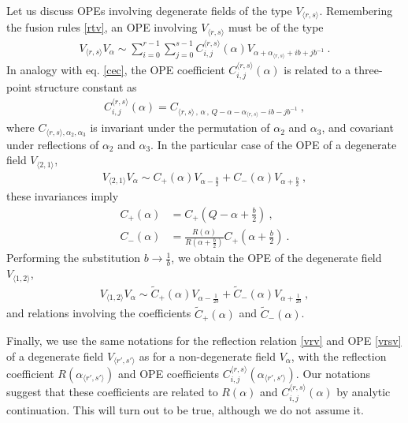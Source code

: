 \documentclass[12pt, a4paper, notitlepage, twoside]{report}
\numberwithin{equation}{section}
\theoremstyle{break}
\begin{document}
Let us discuss OPEs involving degenerate fields of the type $V_{\langle r,s \rangle}$.
Remembering the fusion rules \eqref{rtv}, an OPE involving $V_{\langle r,s \rangle}$ must be of the type
\begin{align}
 \boxed{V_{\langle r,s \rangle} V_\alpha \sim \sum_{i=0}^{r-1}\sum_{j=0}^{s-1} C_{i,j}^{\langle r,s \rangle}(\alpha) V_{\alpha+\alpha_{\langle r,s \rangle}+ib+jb^{-1}}}\ .
\label{vrsv}
\end{align}
In analogy with eq. \eqref{cec}, the OPE coefficient $C_{i,j}^{\langle r,s \rangle}(\alpha)$ is related to a three-point structure constant  as 
\begin{align}
 C_{i,j}^{\langle r,s \rangle}(\alpha) = C_{\langle r,s \rangle\, ,\, \alpha\, ,\, Q-\alpha-\alpha_{\langle r,s \rangle}-ib-jb^{-1}}\ , 
\end{align}
where $C_{\langle r,s \rangle, \alpha_2,\alpha_3}$ is invariant under the permutation of $\alpha_2$ and $\alpha_3$, and covariant under reflections of $\alpha_2$ and $\alpha_3$.
In the particular case of the OPE of a degenerate field $V_{\langle 2,1 \rangle}$,
\begin{align}
 \boxed{V_{\langle 2,1 \rangle} V_\alpha \sim C_+(\alpha) V_{\alpha-\frac{b}{2}} + C_-(\alpha) V_{\alpha+\frac{b}{2}}}\ ,
\label{vot}
\end{align}
 these invariances imply 
\begin{align}
 C_+(\alpha) &= C_+(Q-\alpha+\tfrac{b}{2})\ ,
\label{cpcp}
\\
C_-(\alpha) & = \frac{R(\alpha)}{R(\alpha+\tfrac{b}{2})} C_+(\alpha+\tfrac{b}{2})\ . 
\label{cmcp}
\end{align}
Performing the substitution $b\to \frac{1}{b}$, we obtain
the OPE of the degenerate field $V_{\langle 1,2 \rangle}$,
\begin{align}
\boxed{V_{\langle 1,2 \rangle} V_\alpha \sim \tilde{C}_+(\alpha) V_{\alpha-\frac{1}{2b}} + \tilde{C}_-(\alpha) V_{\alpha+\frac{1}{2b}}}\ ,
 \label{vto}
\end{align}
and relations involving the coefficients $\tilde{C}_+(\alpha)$ and $\tilde{C}_-(\alpha)$. 

Finally, we use the same notations for the reflection relation \eqref{vrv} and OPE \eqref{vrsv} of a degenerate field $V_{\langle r',s'\rangle}$ as for a non-degenerate field $V_{\alpha}$, with the reflection coefficient $R(\alpha_{\langle r',s'\rangle})$ and OPE coefficients $C_{i,j}^{\langle r,s \rangle}(\alpha_{\langle r',s'\rangle})$. 
Our notations suggest that these coefficients are related to $R(\alpha)$ and $C_{i,j}^{\langle r,s \rangle}(\alpha)$ by analytic continuation. 
This will turn out to be true, although we do not assume it. 
\end{document}
